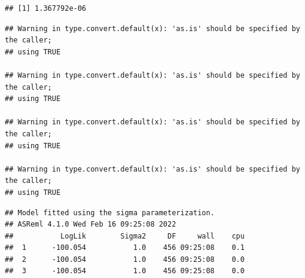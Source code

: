 \documentclass[
  12pt,
]{book}
\newenvironment{Shaded}{\begin{snugshade}}{\end{snugshade}}
\newcommand{\DataTypeTok}[1]{\textcolor[rgb]{0.13,0.29,0.53}{#1}}
\newcommand{\KeywordTok}[1]{\textcolor[rgb]{0.13,0.29,0.53}{\textbf{#1}}}
\newcommand{\NormalTok}[1]{#1}
\newcommand{\OperatorTok}[1]{\textcolor[rgb]{0.81,0.36,0.00}{\textbf{#1}}}
\newcommand{\StringTok}[1]{\textcolor[rgb]{0.31,0.60,0.02}{#1}}
\begin{document}
\begin{verbatim}
## [1] 1.367792e-06
\end{verbatim}

\begin{Shaded}
\end{Shaded}

\begin{verbatim}
## Warning in type.convert.default(x): 'as.is' should be specified by the caller;
## using TRUE

## Warning in type.convert.default(x): 'as.is' should be specified by the caller;
## using TRUE

## Warning in type.convert.default(x): 'as.is' should be specified by the caller;
## using TRUE

## Warning in type.convert.default(x): 'as.is' should be specified by the caller;
## using TRUE
\end{verbatim}

\begin{verbatim}
## Model fitted using the sigma parameterization.
## ASReml 4.1.0 Wed Feb 16 09:25:08 2022
##           LogLik        Sigma2     DF     wall    cpu
##  1      -100.054           1.0    456 09:25:08    0.1
##  2      -100.054           1.0    456 09:25:08    0.0
##  3      -100.054           1.0    456 09:25:08    0.0
\end{verbatim}
\end{document}
